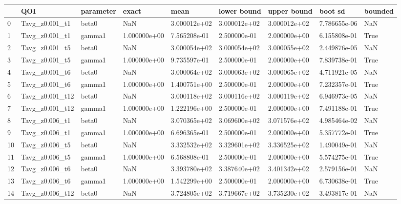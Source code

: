 \begin{tabular}{lllllllll}
\toprule
{} &               QOI & parameter &        exact &         mean &  lower bound &  upper bound &      boot sd & bounded \\
\midrule
0  &    Tavg_z0.001_t1 &     beta0 &          NaN & 3.000012e+02 & 3.000012e+02 & 3.000012e+02 & 7.786655e-06 &     NaN \\
1  &    Tavg_z0.001_t1 &    gamma1 & 1.000000e+00 & 7.565208e-01 & 2.500000e-01 & 2.000000e+00 & 6.155808e-01 &    True \\
2  &    Tavg_z0.001_t5 &     beta0 &          NaN & 3.000054e+02 & 3.000054e+02 & 3.000055e+02 & 2.449876e-05 &     NaN \\
3  &    Tavg_z0.001_t5 &    gamma1 & 1.000000e+00 & 9.735597e-01 & 2.500000e-01 & 2.000000e+00 & 7.839738e-01 &    True \\
4  &    Tavg_z0.001_t6 &     beta0 &          NaN & 3.000064e+02 & 3.000063e+02 & 3.000065e+02 & 4.711921e-05 &     NaN \\
5  &    Tavg_z0.001_t6 &    gamma1 & 1.000000e+00 & 1.400751e+00 & 2.500000e-01 & 2.000000e+00 & 7.232357e-01 &    True \\
6  &   Tavg_z0.001_t12 &     beta0 &          NaN & 3.000118e+02 & 3.000116e+02 & 3.000119e+02 & 6.946973e-05 &     NaN \\
7  &   Tavg_z0.001_t12 &    gamma1 & 1.000000e+00 & 1.222196e+00 & 2.500000e-01 & 2.000000e+00 & 7.491188e-01 &    True \\
8  &    Tavg_z0.006_t1 &     beta0 &          NaN & 3.070365e+02 & 3.069600e+02 & 3.071576e+02 & 4.985464e-02 &     NaN \\
9  &    Tavg_z0.006_t1 &    gamma1 & 1.000000e+00 & 6.696365e-01 & 2.500000e-01 & 2.000000e+00 & 5.357772e-01 &    True \\
10 &    Tavg_z0.006_t5 &     beta0 &          NaN & 3.332532e+02 & 3.329601e+02 & 3.336525e+02 & 1.490049e-01 &     NaN \\
11 &    Tavg_z0.006_t5 &    gamma1 & 1.000000e+00 & 6.568808e-01 & 2.500000e-01 & 2.000000e+00 & 5.574275e-01 &    True \\
12 &    Tavg_z0.006_t6 &     beta0 &          NaN & 3.393780e+02 & 3.387640e+02 & 3.401342e+02 & 2.579156e-01 &     NaN \\
13 &    Tavg_z0.006_t6 &    gamma1 & 1.000000e+00 & 1.542299e+00 & 2.500000e-01 & 2.000000e+00 & 6.730638e-01 &    True \\
14 &   Tavg_z0.006_t12 &     beta0 &          NaN & 3.724805e+02 & 3.719667e+02 & 3.735230e+02 & 3.493817e-01 &     NaN \\

\end{tabular}
